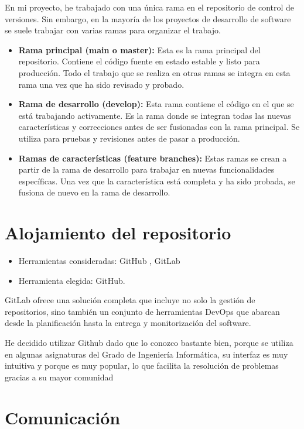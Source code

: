 En mi proyecto, he trabajado con una única rama en el repositorio de control de versiones. Sin embargo, en la mayoría de los proyectos de desarrollo de software se suele trabajar con varias ramas para organizar el trabajo. 

\begin{itemize}
\item \textbf{Rama principal (main o master):} Esta es la rama principal del repositorio. Contiene el código fuente en estado estable y listo para producción. Todo el trabajo que se realiza en otras ramas se integra en esta rama una vez que ha sido revisado y probado.
\item \textbf{Rama de desarrollo (develop):} Esta rama contiene el código en el que se está trabajando activamente. Es la rama donde se integran todas las nuevas características y correcciones antes de ser fusionadas con la rama principal. Se utiliza para pruebas y revisiones antes de pasar a producción.

\item \textbf{Ramas de características (feature branches):} Estas ramas se crean a partir de la rama de desarrollo para trabajar en nuevas funcionalidades específicas. Una vez que la característica está completa y ha sido probada, se fusiona de nuevo en la rama de desarrollo. 
\end{itemize}

\section{Alojamiento del repositorio}\label{alojamiento_repositorio}
\begin{itemize}
\item
  Herramientas consideradas: GitHub \citep{online:github}, GitLab \citep{online:gitlab}
\item
  Herramienta elegida: GitHub. 
\end{itemize}
GitLab ofrece una solución completa que incluye no solo la gestión de repositorios, sino también un conjunto de herramientas DevOps que abarcan desde la planificación hasta la entrega y monitorización del software.

He decidido utilizar Github dado que lo conozco bastante bien, porque se utiliza en algunas asignaturas del Grado de Ingeniería Informática, su interfaz es muy intuitiva y porque es muy popular, lo que facilita la resolución de problemas gracias a su mayor comunidad

\section{Comunicación}\label{comunicacion}

